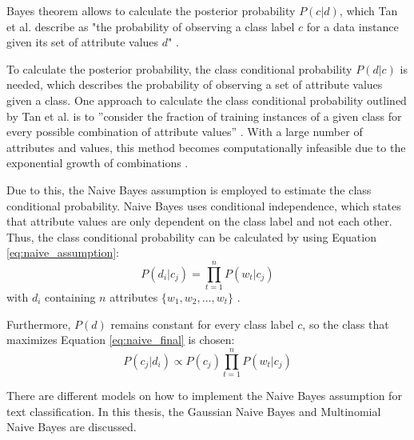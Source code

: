 
        Bayes theorem allows to calculate the posterior probability $P(c|d)$, which Tan et al. describe as "the probability of observing a class label $c$ for a data instance given its set of attribute values $d$" \cite[p.~418]{DBLP:books/aw/TanSKK2019}. 

        To calculate the posterior probability, the class conditional probability $P(d|c)$ is needed, which describes the probability of observing a set of attribute values given a class. One approach to calculate the class conditional probability outlined by Tan et al. is to ''consider the fraction of training instances of a given class for every possible combination of attribute values'' \cite[p.~419]{DBLP:books/aw/TanSKK2019}. With a large number of attributes and values, this method becomes computationally infeasible due to the exponential growth of combinations \cite{DBLP:books/aw/TanSKK2019}.

        Due to this, the Naive Bayes assumption is employed to estimate the class conditional probability. Naive Bayes uses conditional independence, which states that attribute values are only dependent on the class label and not each other. Thus, the class conditional probability can be calculated by using Equation \eqref{eq:naive_assumption}:
        \begin{equation}
            \label{eq:naive_assumption}
            P(d_i|c_j) = \prod_{t=1}^{n}P(w_{t}|c_j)
        \end{equation}
        with $d_i$ containing $n$ attributes $\{w_1,w_2,...,w_t\}$ \cite{DBLP:books/aw/TanSKK2019}.

        Furthermore, $P(d)$ remains constant for every class label $c$, so the class that maximizes Equation \eqref{eq:naive_final} is chosen: 
        \begin{equation}
            \label{eq:naive_final}
            P(c_j|d_i)\propto P(c_j)\prod_{t=1}^{n}P(w_{t}|c_j) 
        \end{equation}   
        
        
        There are different models on how to implement the Naive Bayes assumption for text classification. In this thesis, the Gaussian Naive Bayes and Multinomial Naive Bayes are discussed. 
        
